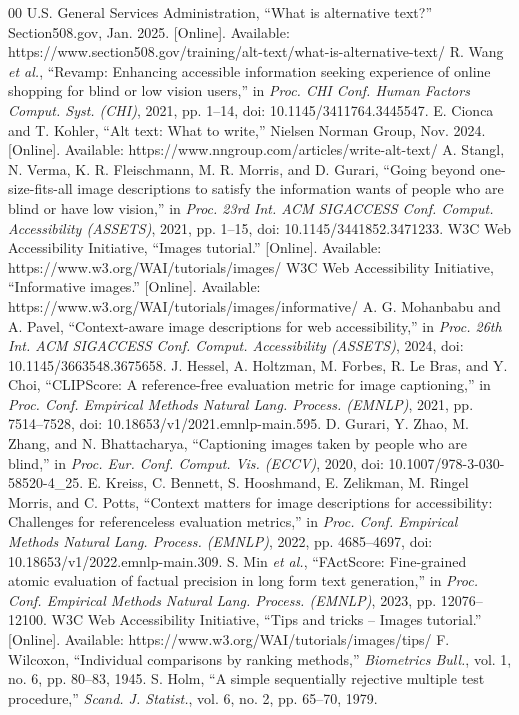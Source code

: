 \begin{thebibliography}{00}
 U.S. General Services Administration, ``What is alternative text?'' Section508.gov, Jan. 2025. [Online]. Available: https://www.section508.gov/training/alt-text/what-is-alternative-text/
 R. Wang \textit{et al.}, ``Revamp: Enhancing accessible information seeking experience of online shopping for blind or low vision users,'' in \textit{Proc. CHI Conf. Human Factors Comput. Syst. (CHI)}, 2021, pp. 1--14, doi: 10.1145/3411764.3445547.
 E. Cionca and T. Kohler, ``Alt text: What to write,'' Nielsen Norman Group, Nov. 2024. [Online]. Available: https://www.nngroup.com/articles/write-alt-text/
 A. Stangl, N. Verma, K. R. Fleischmann, M. R. Morris, and D. Gurari, ``Going beyond one-size-fits-all image descriptions to satisfy the information wants of people who are blind or have low vision,'' in \textit{Proc. 23rd Int. ACM SIGACCESS Conf. Comput. Accessibility (ASSETS)}, 2021, pp. 1--15, doi: 10.1145/3441852.3471233.
 W3C Web Accessibility Initiative, ``Images tutorial.'' [Online]. Available: https://www.w3.org/WAI/tutorials/images/
 W3C Web Accessibility Initiative, ``Informative images.'' [Online]. Available: https://www.w3.org/WAI/tutorials/images/informative/
 A. G. Mohanbabu and A. Pavel, ``Context-aware image descriptions for web accessibility,'' in \textit{Proc. 26th Int. ACM SIGACCESS Conf. Comput. Accessibility (ASSETS)}, 2024, doi: 10.1145/3663548.3675658.
 J. Hessel, A. Holtzman, M. Forbes, R. Le Bras, and Y. Choi, ``CLIPScore: A reference-free evaluation metric for image captioning,'' in \textit{Proc. Conf. Empirical Methods Natural Lang. Process. (EMNLP)}, 2021, pp. 7514--7528, doi: 10.18653/v1/2021.emnlp-main.595.
 D. Gurari, Y. Zhao, M. Zhang, and N. Bhattacharya, ``Captioning images taken by people who are blind,'' in \textit{Proc. Eur. Conf. Comput. Vis. (ECCV)}, 2020, doi: 10.1007/978-3-030-58520-4\_25.
 E. Kreiss, C. Bennett, S. Hooshmand, E. Zelikman, M. Ringel Morris, and C. Potts, ``Context matters for image descriptions for accessibility: Challenges for referenceless evaluation metrics,'' in \textit{Proc. Conf. Empirical Methods Natural Lang. Process. (EMNLP)}, 2022, pp. 4685--4697, doi: 10.18653/v1/2022.emnlp-main.309.
 S. Min \textit{et al.}, ``FActScore: Fine-grained atomic evaluation of factual precision in long form text generation,'' in \textit{Proc. Conf. Empirical Methods Natural Lang. Process. (EMNLP)}, 2023, pp. 12076--12100.
 W3C Web Accessibility Initiative, ``Tips and tricks -- Images tutorial.'' [Online]. Available: https://www.w3.org/WAI/tutorials/images/tips/
 F. Wilcoxon, ``Individual comparisons by ranking methods,'' \textit{Biometrics Bull.}, vol. 1, no. 6, pp. 80--83, 1945.
 S. Holm, ``A simple sequentially rejective multiple test procedure,'' \textit{Scand. J. Statist.}, vol. 6, no. 2, pp. 65--70, 1979.
\end{thebibliography}
